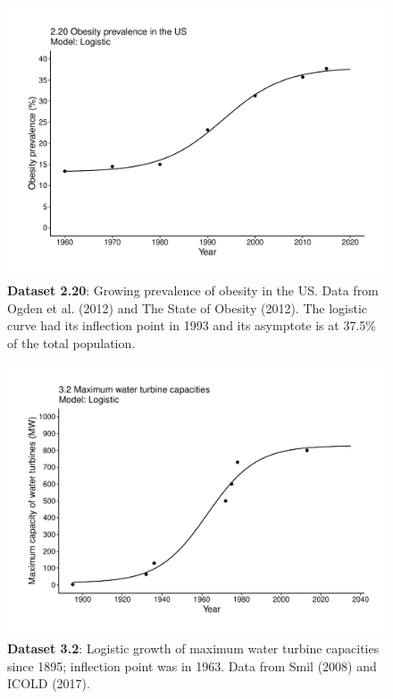\documentclass[aps,rmp,preprint,superscriptaddress,10pt,onecolumn]{article}
\begin{document}
\clearpage
\begin{figure}[h]
\includegraphics[width=\textwidth]{output/figs-ggplot/2.20.pdf}
\caption{\textbf{Dataset 2.20}: Growing prevalence of obesity in the US. Data from Ogden et al. (2012) and The State of Obesity (2012). The logistic curve had its inflection point in 1993 and its asymptote is at 37.5\% of the total population.}
\end{figure}
	
\clearpage
\begin{figure}[h]
\includegraphics[width=\textwidth]{output/figs-ggplot/3.2.pdf}
\caption{\textbf{Dataset 3.2}: Logistic growth of maximum water turbine capacities since 1895; inflection point was in 1963. Data from Smil (2008) and ICOLD (2017).}
\end{figure}
	
\end{document}

